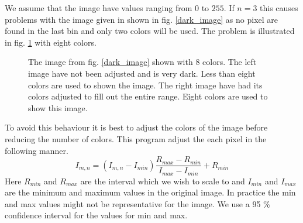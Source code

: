 \documentclass[a4paper, 10pt, final]{article}
\begin{document}
We assume that the image have values ranging from $0$ to $255$. If
$n=3$ this causes problems with the image given in shown in fig.
\ref{dark_image} as no pixel are found in the last bin and only two
colors will be used. The problem is illustrated in fig. \ref{n8}
with eight colors.

\begin{figure}[!h]
    \centering
    \caption[]{The image from fig. \ref{dark_image} shown with 8
    colors. The left image have not been adjusted and is very dark.
    Less than eight colors are used to shown the image. The right image
    have had its colors adjusted to fill out the entire range. Eight
    colors are used to show this image.}
    \label{n8}
\end{figure}

To avoid this behaviour it is best to adjust the colors of the image
before reducing the number of colors. This program adjust the each pixel
in the following manner.
\begin{equation*}
    I_{m, n} =  (I_{m, n} - I_{min})\frac{R_{max} - R_{min}}{I_{max} - I_{min}} + R_{min}
\end{equation*}
Here $R_{min}$ and $R_{max}$ are the interval which we wish to scale to
and $I_{min}$ and $I_{max}$ are the minimum and maximum values in the
original image. In practice the min and max values might not be
representative for the image. We use a 95 \% confidence interval for the
values for min and max.
\end{document}

